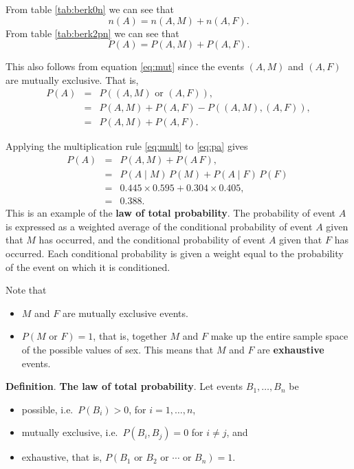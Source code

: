 \documentclass[
  11pt,
  british,
  openany, a4paper]{book}
\providecommand{\tightlist}{%
  \setlength{\itemsep}{0pt}\setlength{\parskip}{0pt}}
\begin{document}
From table \ref{tab:berk0n} we can see that
\[ n(A) = n(A , M) + n(A , F). \]
From table \ref{tab:berk2pn} we can see that
\begin{equation}
P(A) = P(A , M) + P(A , F). 
\label{eq:pa}
\end{equation}

This also follows from equation \eqref{eq:mut} since the events \((A , M)\) and \((A , F)\) are mutually exclusive. That is,
\begin{eqnarray}
 P(A) &=& P((A , M) \mbox{ or } (A , F) ), \\
 &=& P(A , M) + P(A , F) - P((A , M) , (A , F)), \\
 &=& P(A , M) + P(A , F). 
\end{eqnarray}

Applying the multiplication rule \eqref{eq:mult} to \eqref{eq:pa} gives
\begin{eqnarray}
P(A) &=& P(A , M) + P(A \, F), \\
     &=& P(A \mid M)\,P(M) + P(A \mid F)\,P(F)\ \\
     &=& 0.445 \times 0.595 + 0.304 \times 0.405, \\
     &=& 0.388.
\end{eqnarray}
This is an example of the \textbf{law of total probability}. The probability of event \(A\) is expressed as a weighted average of the conditional probability of event \(A\) given that \(M\) has occurred, and the conditional probability of event \(A\) given that \(F\) has occurred. Each conditional probability is given a weight equal to the probability of the event on which it is conditioned.

Note that

\begin{itemize}
\tightlist
\item
  \(M\) and \(F\) are mutually exclusive events.
\item
  \(P(M \mbox{ or } F) = 1\), that is, together \(M\) and \(F\) make up the entire sample space of the possible values of sex. This means that \(M\) and \(F\) are \textbf{exhaustive} events.
\end{itemize}

\textbf{Definition}. \textbf{The law of total probability}. Let events \(B_1,\ldots,B_n\) be

\begin{itemize}
\tightlist
\item
  possible, i.e.~\(P(B_i) > 0\), for \(i = 1, \ldots, n\),
\item
  mutually exclusive, i.e.~\(P(B_i , B_j)=0\) for \(i \neq j\), and
\item
  exhaustive, that is, \(P(B_1 \mbox{ or } B_2 \mbox{ or } \cdots \mbox{ or } B_n) = 1\).
\end{itemize}
\end{document}
